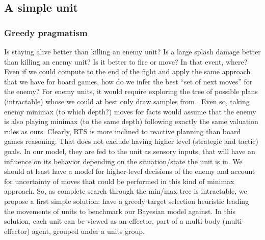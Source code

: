 \subsection{A simple unit}
\subsubsection{Greedy pragmatism}
Is staying alive better than killing an enemy unit? Is a large splash damage better than killing an enemy unit? Is it better to fire or move? In that event, where? Even if we could compute to the end of the fight and apply the same approach that we have for board games, how do we infer the best ``set of next moves'' for the enemy? %
For enemy units, it would require exploring the tree of possible plans (intractable) whose we could at best only draw samples from \citep{UCT}. Even so, taking enemy minimax (to which depth?) moves for facts would assume that the enemy is also playing minimax (to the same depth) following exactly the same valuation rules as ours. Clearly, RTS  is more inclined to reactive planning than board games reasoning. That does not exclude having higher level (strategic and tactic) goals. In our model, they are fed to the unit as sensory inputs, that will have an influence on its behavior depending on the situation/state the unit is in. 
We should at least have a model for higher-level decisions of the enemy and account for uncertainty of moves that could be performed in this kind of minimax approach. So, as complete search through the min/max tree is intractable, we propose a first simple solution: have a greedy target selection heuristic leading the movements of units to benchmark our Bayesian model against. In this solution, each unit can be viewed as an effector, part of a multi-body (multi-effector) agent, grouped under a units group. 

